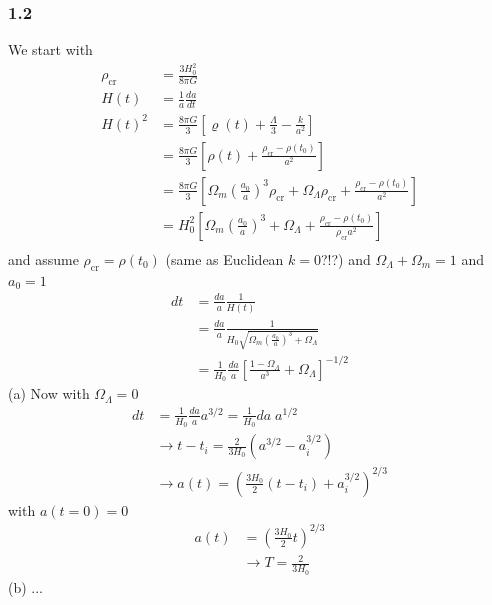 \documentclass[10pt,a4paper]{article}
\theoremstyle{definition}
\begin{document}
\subsubsection{1.2}
We start with 
\begin{align}
\rho_\text{cr}&=\frac{3H_0^2}{8\pi G}\\
H(t)&=\frac{1}{a}\frac{da}{dt}\\
H(t)^2
&=\frac{8\pi G}{3}\left[\varrho(t)+\frac{\Lambda}{3}-\frac{k}{a^2}\right]\\
&=\frac{8\pi G}{3}\left[\rho(t)+\frac{\rho_\text{cr}-\rho(t_0)}{a^2}\right]\\
&=\frac{8\pi G}{3}\left[\Omega_m\left(\frac{a_0}{a}\right)^3\rho_\text{cr}+\Omega_\Lambda\rho_\text{cr}+\frac{\rho_\text{cr}-\rho(t_0)}{a^2}\right]\\
&=H_0^2\left[\Omega_m\left(\frac{a_0}{a}\right)^3+\Omega_\Lambda+\frac{\rho_\text{cr}-\rho(t_0)}{\rho_\text{cr}a^2}\right]\\
\end{align}
and assume $\rho_\text{cr}=\rho(t_0)$ (same as Euclidean $k=0$?!?) and $\Omega_\Lambda+\Omega_m=1$ and $a_0=1$
\begin{align}
dt&=\frac{da}{a}\frac{1}{H(t)}\\
&=\frac{da}{a}\frac{1}{H_0\sqrt{\Omega_m\left(\frac{a_0}{a}\right)^3+\Omega_\Lambda}}\\
&=\frac{1}{H_0}\frac{da}{a}\left[\frac{1-\Omega_\Lambda}{a^3}+\Omega_\Lambda\right]^{-1/2}
\end{align}
(a) Now with $\Omega_\Lambda=0$
\begin{align}
dt&=\frac{1}{H_0}\frac{da}{a}a^{3/2}=\frac{1}{H_0}da\;a^{1/2}\\
&\rightarrow t-t_i=\frac{2}{3H_0}(a^{3/2}-a_i^{3/2})\\
&\rightarrow a(t)=\left(\frac{3H_0}{2}(t-t_i)+a_i^{3/2}\right)^{2/3}
\end{align}
with $a(t=0)=0$
\begin{align}
a(t)&=\left(\frac{3H_0}{2}t\right)^{2/3}\\
&\rightarrow T=\frac{2}{3H_0}
\end{align}
(b) ...
\end{document}
